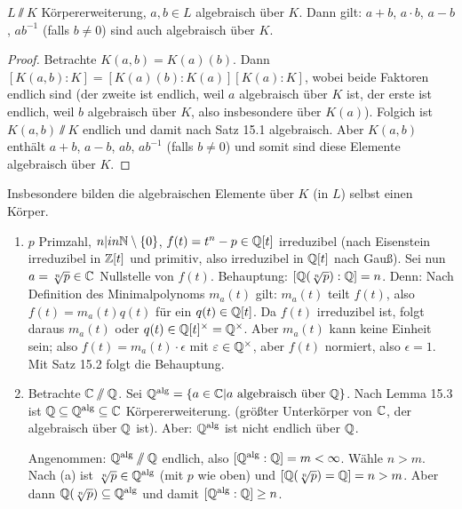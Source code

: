 \documentclass[12pt,a4paper]{scrartcl}
\begin{document}
\begin{lem}
	$L\sslash K$ Körpererweiterung, $a,b\in L$ algebraisch über $K$. Dann gilt: $a+b$, $a\cdot b$, $a-b$, $ab^{-1}$ (falls $b\neq 0$) sind auch algebraisch über $K$.
\end{lem}
\begin{proof}
	Betrachte $K(a,b) = K(a)(b)$. Dann $[K(a,b):K] = [K(a)(b):K(a)][K(a):K]$, wobei beide Faktoren endlich sind (der zweite ist endlich, weil $a$ algebraisch über $K$ ist, der erste ist endlich, weil $b$ algebraisch über $K$, also insbesondere über $K(a)$). Folgich ist $K(a,b)\sslash K$ endlich und damit nach Satz 15.1 algebraisch. Aber $K(a,b)$ enthält $a+b$, $a-b$, $ab$, $ab^{-1}$ (falls $b\neq 0$) und somit sind diese Elemente algebraisch über $K$.
\end{proof}

\begin{bem}
	Insbesondere bilden die algebraischen Elemente über $K$ (in $L$) selbst einen Körper.
\end{bem}
	
\begin{bsp}
	\leavevmode
	\begin{enumerate}
	\item $p$ Primzahl, $n|in\mathbb N\setminus\{0\}$, $f(t) = t^n-p\in \mathbb Q[t]$ irreduzibel (nach Eisenstein irreduzibel in $\mathbb Z[t]$ und primitiv, also irreduzibel in $\mathbb Q[t]$ nach Gauß).
	Sei nun $a = \sqrt[n]{p}\in\mathbb C$ Nullstelle von $f(t)$. Behauptung: $[\mathbb Q(\sqrt[n]{p}): \mathbb Q] = n$.  Denn: Nach Definition des Minimalpolynoms $m_a(t)$ gilt: $m_a(t)$ teilt $f(t)$, also $f(t) = m_a(t)q(t)$ für ein $q(t)\in\mathbb Q[t]$. Da $f(t)$ irreduzibel ist, folgt daraus $m_a(t)$ oder $q(t)\in \mathbb Q[t]^{\times} = \mathbb Q^{\times}$. Aber $m_a(t)$ kann keine Einheit sein; also $f(t) = m_a(t)\cdot \epsilon $ mit $\varepsilon\in \mathbb Q^{\times}$, aber $f(t)$ normiert, also $\epsilon = 1$. Mit Satz 15.2 folgt die Behauptung.
	\item Betrachte $\mathbb C\sslash \mathbb Q$. Sei $\mathbb Q^{\text{alg}} = \{a\in\mathbb C|a\text{ algebraisch über }\mathbb Q\}$. Nach Lemma 15.3 ist $\mathbb Q\subseteq\mathbb Q^{\text{alg}}\subseteq \mathbb C$ Körpererweiterung. (größter Unterkörper von $\mathbb C$, der algebraisch über $\mathbb Q$ ist). Aber: $\mathbb Q^{\text{alg}}$ ist nicht endlich über $\mathbb Q$.
	
	Angenommen: $\mathbb Q^{\text{alg}}\sslash \mathbb Q$ endlich, also $[\mathbb Q^{\text{alg}}:\mathbb Q] = m<\infty$. Wähle $n>m$. Nach (a) ist $\sqrt[n]p \in \mathbb Q^{\text{alg}}$ (mit $p$ wie oben) und $[\mathbb Q(\sqrt[n]p) = \mathbb Q] = n > m$. Aber dann $\mathbb Q(\sqrt[n]p)\subseteq \mathbb Q^{\text{alg}}$ und damit $[\mathbb Q^{\text{alg}}:\mathbb Q]\geq n$.
	\end{enumerate}
\end{bsp}
\end{document}
